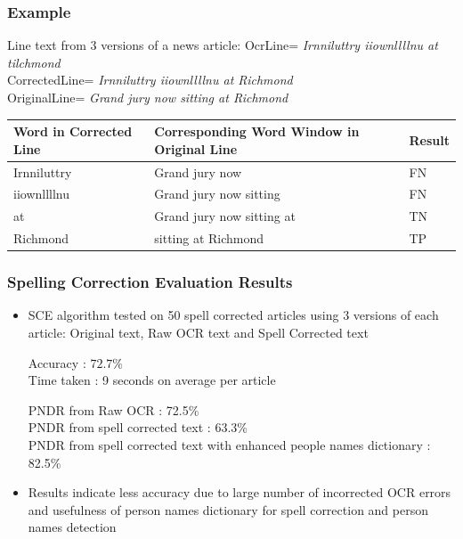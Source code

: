 \documentclass{beamer}
\begin{document}
\begin{frame}
\frametitle{Example}
\begin{block}{Line text from 3 versions of a news article:}
OcrLine= \textit{Irnniluttry iiownllllnu at tilchmond}\\

CorrectedLine= \textit{Irnniluttry iiownllllnu at Richmond}\\

OriginalLine= \textit{Grand jury now sitting at Richmond} 
\end{block}

\begin{table}[bt]
\begin{tabular}{|p{2.5cm}|p{4.5cm}|p{2cm}|} \hline
\textbf{Word in Corrected Line} & \textbf{Corresponding Word Window in Original Line}& \textbf{Result} \\ \hline
Irnniluttry & Grand jury now & FN \\ \hline
iiownllllnu & Grand jury now sitting & FN \\ \hline
at & Grand jury now sitting at & TN \\ \hline
Richmond  &  sitting at Richmond & TP \\ \hline
\end{tabular}
\end{table}
\end{frame}

\begin{frame}
\frametitle{Spelling Correction Evaluation Results}
\begin{itemize}
\item
SCE algorithm tested on 50 spell corrected articles using 3 versions of each article: Original text, Raw OCR text and Spell Corrected text

\begin{block}{}
Accuracy :  $72.7 \%$\\
Time taken : 9 seconds on average per article
\end{block}

\begin{block}{}
PNDR from Raw OCR : 72.5\% \\

PNDR from spell corrected text : 63.3\% \\

PNDR from spell corrected text with enhanced people names dictionary : 82.5\% \\
\end{block}
\item
Results indicate less accuracy due to large number of incorrected OCR errors and usefulness of person names dictionary for spell correction and person names detection 
\end{itemize}
\end{frame}
\end{document}
